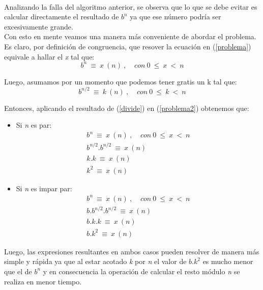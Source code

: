 \paragraph{}
Analizando la falla del algoritmo anterior, se observa que lo que se debe evitar es calcular directamente el resultado de $b^n$ ya que ese número podría ser excesivamente grande. \\
Con esto en mente veamos una manera más conveniente de abordar el problema. Es claro, por definición de congruencia, que resover la ecuación en (\ref{problema}) equivale a hallar el \textit{x} tal que:
	\begin{equation}
		b^n\ \equiv\ x\ (n)\ , \hspace{10pt}\ con\ 0\ \leq\ x\ <\ n 
	\label{problema2}
	\end{equation}

Luego, asumamos por un momento que podemos tener gratis un k tal que:
	\begin{equation}
		b^{n/2}\ \equiv\ k\ (n)\ , \hspace{10pt}\ con\ 0\ \leq\ k\ <\ n 
	\label{divide}
	\end{equation}

Entonces, aplicando el resultado de (\ref{divide}) en (\ref{problema2}) obtenemos que:
	\begin{itemize}
		\item{
		Si \textit{n} es par:
			\begin{eqnarray}
				b^n\ \equiv\ x\ (n)\ , \hspace{10pt}\ con\ 0\ \leq\ x\ <\ n \nonumber\\
				b^{n/2}.b^{n/2}\ \equiv\ x\ (n) \nonumber\\
				k.k\ \equiv\ x\ (n) \nonumber\\
				k^2\ \equiv\ x\ (n)
			\label{recursion_par}
			\end{eqnarray}
		}
		
		\item{
		Si \textit{n} es impar par:
			\begin{eqnarray}
				b^n\ \equiv\ x\ (n)\ , \hspace{10pt}\ con\ 0\ \leq\ x\ <\ n \nonumber\\
				b.b^{n/2}.b^{n/2}\ \equiv\ x\ (n) \nonumber\\
				b.k.k\ \equiv\ x\ (n) \nonumber\\
				b.k^2\ \equiv\ x\ (n)
			\label{recursion_impar} 
			\end{eqnarray}
		}
	\end{itemize}
Luego, las expresiones resultantes en ambos casos pueden resolver de manera más simple y rápida ya que al estar acotado \textit{k} por \textit{n} el valor de $b.k^2$ es mucho menor que el de  $b^n$ y en consecuencia la operación de calcular el resto módulo \textit{n} se realiza en menor tiempo.

